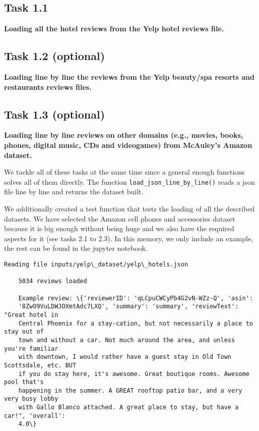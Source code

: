 \documentclass[11pt]{article}
\begin{document}
\hypertarget{task-1.1}{%
    \subsection{Task 1.1}\label{task-1.1}}

\textbf{Loading all the hotel reviews from the Yelp hotel reviews file.}

\hypertarget{task-1.2-optional}{%
    \subsection{Task 1.2 (optional)}\label{task-1.2-optional}}

\textbf{Loading line by line the reviews from the Yelp beauty/spa
    resorts and restaurants reviews files.}

\hypertarget{task-1.3-optional}{%
    \subsection{Task 1.3 (optional)}\label{task-1.3-optional}}

\textbf{Loading line by line reviews on other domains (e.g., movies,
    books, phones, digital music, CDs and videogames) from McAuley's Amazon
    dataset.}

We tackle all of these tasks at the same time since a general enough
functions solves all of them directly. The function
\texttt{load\_json\_line\_by\_line()} reads a json file line by line and
returns the dataset built.

We additionally created a test function that tests the loading of all the
described datasets. We have selected the Amazon cell phones and
accessories dataset because it is big enough without being huge and we
also have the required aspects for it (see tasks 2.1 to 2.3). In this memory, we only include an example, the rest can be found in the jupyter notebook.


\begin{Verbatim}[commandchars=\\\{\}]
    Reading file inputs/yelp\_dataset/yelp\_hotels.json

    5034 reviews loaded

    Example review: \{'reviewerID': 'qLCpuCWCyPb4G2vN-WZz-Q', 'asin':
    '8ZwO9VuLDWJOXmtAdc7LXQ', 'summary': 'summary', 'reviewText': "Great hotel in
    Central Phoenix for a stay-cation, but not necessarily a place to stay out of
    town and without a car. Not much around the area, and unless you're familiar
    with downtown, I would rather have a guest stay in Old Town Scottsdale, etc. BUT
    if you do stay here, it's awesome. Great boutique rooms. Awesome pool that's
    happening in the summer. A GREAT rooftop patio bar, and a very very busy lobby
    with Gallo Blanco attached. A great place to stay, but have a car!", 'overall':
    4.0\}

\end{Verbatim}
\end{document}

